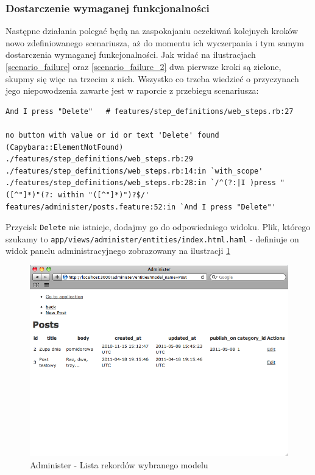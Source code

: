    \subsubsection{Dostarczenie wymaganej funkcjonalności}
   
   Następne działania polegać będą na zaspokajaniu oczekiwań kolejnych kroków nowo zdefiniowanego scenariusza, aż do momentu ich wyczerpania i tym samym dostarczenia wymaganej funkcjonalności. Jak widać na ilustracjach \ref{scenario_failure} oraz \ref{scenario_failure_2} dwa pierwsze kroki są zielone, skupmy się więc na trzecim z nich. Wszystko co trzeba wiedzieć o przyczynach jego niepowodzenia zawarte jest w raporcie z przebiegu scenariusza:
   
\begin{lstlisting}
And I press "Delete"   # features/step_definitions/web_steps.rb:27

no button with value or id or text 'Delete' found (Capybara::ElementNotFound)
./features/step_definitions/web_steps.rb:29
./features/step_definitions/web_steps.rb:14:in `with_scope'
./features/step_definitions/web_steps.rb:28:in `/^(?:|I )press "([^"]*)"(?: within "([^"]*)")?$/'
features/administer/posts.feature:52:in `And I press "Delete"'
\end{lstlisting}
   
   Przycisk \texttt{Delete} nie istnieje, dodajmy go do odpowiedniego widoku. Plik, którego szukamy to \texttt{app/views/administer/entities/index.html.haml} - definiuje on widok panelu administracyjnego zobrazowany na ilustracji \ref{administer_index}
   
   \clearpage
   
    \begin{figure}[!h]
  		\begin{center}
  			\includegraphics[width=\linewidth]{images/administer_index.png}
  			\caption{Administer - Lista rekordów wybranego modelu}
  			\label{administer_index}
  		\end{center}
  	\end{figure}
  	
